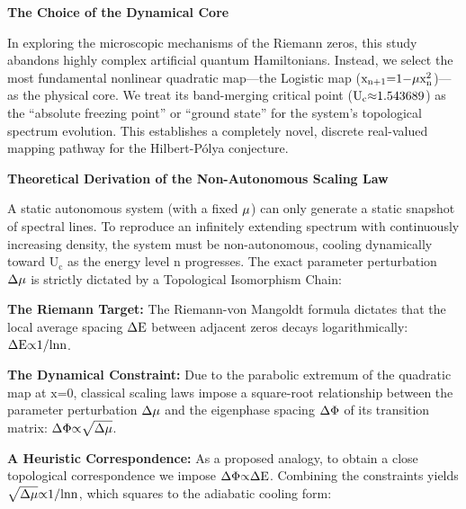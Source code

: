 \documentclass[fleqn,10pt]{wlscirep}
\begin{document}
\textbf{The Choice of the Dynamical Core}

In exploring the microscopic mechanisms of the Riemann zeros, this study
abandons highly complex artificial quantum Hamiltonians. Instead, we
select the most fundamental nonlinear quadratic map---the Logistic map
(\(\text{x}_{\text{n}\text{+1}}\text{=1\ensuremath{-}}\text{\ensuremath{\mu}}\text{x}_{\text{n}}^{\text{2}}\))---as
the physical core. We treat its band-merging critical point
(\(\text{U}_{\text{c}}\text{\ensuremath{\approx}1.543689}\)) as the ``absolute freezing
point'' or ``ground state'' for the system's topological spectrum
evolution. This establishes a completely novel, discrete real-valued
mapping pathway for the Hilbert-P\'olya conjecture.

\textbf{Theoretical Derivation of the Non-Autonomous Scaling Law}

A static autonomous system (with a fixed \(\text{\ensuremath{\mu}}\)) can only generate
a static snapshot of spectral lines. To reproduce an infinitely
extending spectrum with continuously increasing density, the system must
be non-autonomous, cooling dynamically toward \(\text{U}_{\text{c}}\) as
the energy level \(\text{n}\) progresses. The exact parameter
perturbation \(\text{\ensuremath{\Delta}}\text{\ensuremath{\mu}}\) is strictly dictated by a Topological
Isomorphism Chain:

\textbf{The Riemann Target:} The Riemann-von Mangoldt formula dictates
that the local average spacing \(\text{\ensuremath{\Delta}}\text{E}\) between adjacent
zeros decays logarithmically: \(\text{\ensuremath{\Delta}}\text{E}\text{\ensuremath{\propto}1/ln}\text{n}\).

\textbf{The Dynamical Constraint:} Due to the parabolic extremum of the
quadratic map at \(\text{x}\text{=0}\), classical scaling laws impose a
square-root relationship between the parameter perturbation
\(\text{\ensuremath{\Delta}}\text{\ensuremath{\mu}}\) and the eigenphase spacing \(\text{\ensuremath{\Delta}\ensuremath{\Phi}}\) of its
transition matrix: \(\text{\ensuremath{\Delta}\ensuremath{\Phi}\ensuremath{\propto}}\sqrt{\text{\ensuremath{\Delta}}\text{\ensuremath{\mu}}}\).

\textbf{A Heuristic Correspondence:} As a proposed analogy, to obtain a
close topological correspondence we impose \(\text{\ensuremath{\Delta}\ensuremath{\Phi}\ensuremath{\propto}\ensuremath{\Delta}}\text{E}\).
Combining the constraints yields \(\sqrt{\text{\ensuremath{\Delta}}\text{\ensuremath{\mu}}}\text{\ensuremath{\propto}1/ln}\text{n}\),
which squares to the adiabatic cooling form:
\end{document}
